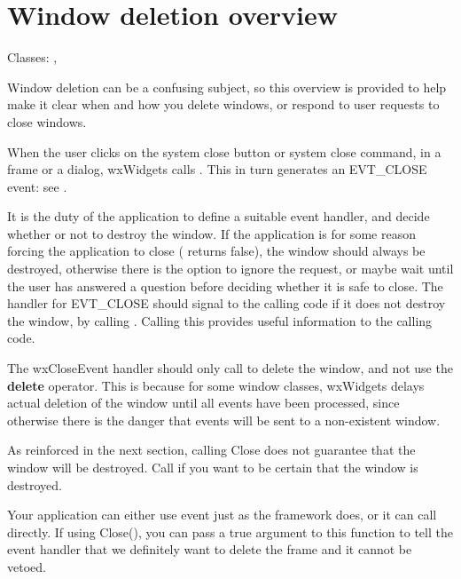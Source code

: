 \section{Window deletion overview}\label{windowdeletionoverview}

Classes: , 

Window deletion can be a confusing subject, so this overview is provided
to help make it clear when and how you delete windows, or respond to user requests
to close windows.


When the user clicks on the system close button or system close command,
in a frame or a dialog, wxWidgets calls . This
in turn generates an EVT\_CLOSE event: see .

It is the duty of the application to define a suitable event handler, and
decide whether or not to destroy the window.
If the application is for some reason forcing the application to close
( returns false), the window should always be destroyed, otherwise there is the option to
ignore the request, or maybe wait until the user has answered a question
before deciding whether it is safe to close. The handler for EVT\_CLOSE should
signal to the calling code if it does not destroy the window, by calling 
. Calling this provides useful information
to the calling code.

The wxCloseEvent handler should only call  to
delete the window, and not use the {\bf delete} operator. This is because
for some window classes, wxWidgets delays actual deletion of the window until all events have been processed,
since otherwise there is the danger that events will be sent to a non-existent window.

As reinforced in the next section, calling Close does not guarantee that the window
will be destroyed. Call  if you want to be
certain that the window is destroyed.


Your application can either use  event just as
the framework does, or it can call  directly.
If using Close(), you can pass a true argument to this function to tell the event handler
that we definitely want to delete the frame and it cannot be vetoed.

